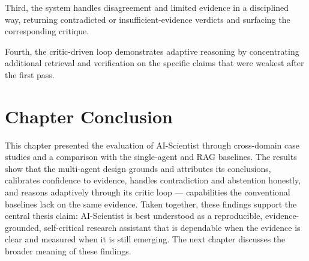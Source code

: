 Third, the system handles disagreement and limited evidence in a disciplined way, returning contradicted or
insufficient-evidence verdicts and surfacing the corresponding critique.

Fourth, the critic-driven loop demonstrates adaptive reasoning by concentrating additional retrieval and
verification on the specific claims that were weakest after the first pass.

\section{Chapter Conclusion }

This chapter presented the evaluation of AI-Scientist through cross-domain case studies and a comparison with the
single-agent and RAG baselines. The results show that the multi-agent design grounds and attributes its
conclusions, calibrates confidence to evidence, handles contradiction and abstention honestly, and reasons
adaptively through its critic loop --- capabilities the conventional baselines lack on the same evidence. Taken
together, these findings support the central thesis claim: AI-Scientist is best understood as a reproducible,
evidence-grounded, self-critical research assistant that is dependable when the evidence is clear and measured
when it is still emerging. The next chapter discusses the broader meaning of these findings.

